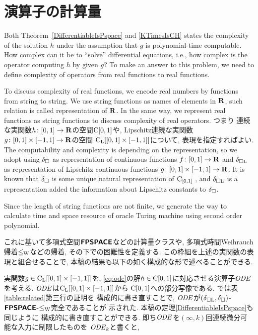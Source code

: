 \section{演算子の計算量}

Both Theorem~\ref{DifferentiableIsPspace} and \ref{KTimesIsCH}
states the complexity of the solution $h$ under the assumption 
that $g$ is polynomial-time computable.
How complex can it be to ``solve'' differential equations,
i.e., how complex is the operator computing $h$ by given $g$?
To make an answer to this problem,
we need to define complexity of operators from real functions to real functions.

To discuss complexity of real functions,
we encode real numbers by functions from string to string.
We use string functions as names of elements in $\mathbf R$,
such relation is called representation of $\mathbf R$.
In the same way, we represent real functions as string functions
to discuss complexity of real operators.
つまり
連続な実関数$h \colon [0,1] \to \mathbf R$の空間$\mathrm C [0, 1]$や, 
Lipschitz連続な実関数$g \colon [0, 1] \times [-1, 1] \to \mathbf R$の空間
$\mathrm C _{\mathrm L} [[0, 1] \times [-1, 1]]$について, 
表現を指定すればよい. 
The computability and complexity is depending on the representation,
so we adopt \cite{kawamura2010operators}
using $\delta _\square$ as representation of continuous functions $f \colon [0,1] \to \mathbf R$ and $\delta _{\square \mathrm L}$ as representation of Lipschitz continuous 
functions $g \colon [0, 1] \times [-1, 1] \to \mathbf R$.
It is known that $\delta _\square$ is some unique natural representation of $\mathrm C_{[0, 1]}$ \cite{kawamura11:_funct_space_repres_and_polyn_time_comput}, 
and $\delta _{\square \mathrm L}$ is a representation
added the information about Lipschitz constants to $\delta _\square$.

Since the length of string functions are not finite,
we generate the way to calculate time and space resource of oracle Turing machine
using second order polynomial.

これに基いて多項式空間$\text{\bfseries \sffamily \upshape FPSPACE}$などの計算量クラスや, 
多項式時間Weihrauch帰着$\leq _{\mathrm W}$などの帰着, 
その下での困難性を定義する\cite{kawamura2010operators}. 
この枠組を上述の実関数の表現と組合せることで, 
本稿の結果も以下の如く構成的な形で述べることができる. 

実関数$g \in \mathrm C _{\mathrm L} [[0, 1] \times [-1, 1]]$を, 
\eqref{eq:ode}の解$h \in \mathrm C [0, 1]$に対応させる演算子$\mathit{ODE}$を考える. 
$\mathit{ODE}$は$\mathrm C _{\mathrm L} [[0, 1] \times [-1, 1]]$から
$\mathrm C [0, 1]$への部分写像である. 
\cite[定理4.9]{kawamura2010operators}では表\ref{table:related}第三行の証明を
構成的に書き直すことで, 
$\mathit{ODE}$が$(\delta _{\square \mathrm L}, \delta _\square)$-$\text{\bfseries \sffamily \upshape FPSPACE}$-$\leq _{\mathrm W}$完全であることが
示された. 
本稿の定理\ref{DifferentiableIsPspace}も同じように
構成的に書き直すことができる. 
即ち$\mathit{ODE}$を$(\infty, k)$回連続微分可能な入力に制限したものを
$\mathit{ODE} _k$と書くと, 


